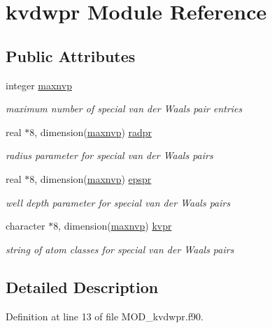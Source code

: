 \hypertarget{classkvdwpr}{\section{kvdwpr Module Reference}
\label{classkvdwpr}
}
\subsection*{Public Attributes}
\begin{DoxyCompactItemize}
\item 
integer \hyperlink{classkvdwpr_a953f1c95b2e2a786aba2e6ab070acba7}{maxnvp}
\begin{DoxyCompactList}\small\item\em maximum number of special van der Waals pair entries \end{DoxyCompactList}\item 
real $\ast$8, dimension(\hyperlink{classkvdwpr_a953f1c95b2e2a786aba2e6ab070acba7}{maxnvp}) \hyperlink{classkvdwpr_a16ab9500f997f0c7103d7d72d19c636a}{radpr}
\begin{DoxyCompactList}\small\item\em radius parameter for special van der Waals pairs \end{DoxyCompactList}\item 
real $\ast$8, dimension(\hyperlink{classkvdwpr_a953f1c95b2e2a786aba2e6ab070acba7}{maxnvp}) \hyperlink{classkvdwpr_aefc977d08f7c4a7df5221f728481efe7}{epspr}
\begin{DoxyCompactList}\small\item\em well depth parameter for special van der Waals pairs \end{DoxyCompactList}\item 
character $\ast$8, dimension(\hyperlink{classkvdwpr_a953f1c95b2e2a786aba2e6ab070acba7}{maxnvp}) \hyperlink{classkvdwpr_af3a68e901602c7a68f74d10294fe54d2}{kvpr}
\begin{DoxyCompactList}\small\item\em string of atom classes for special van der Waals pairs \end{DoxyCompactList}\end{DoxyCompactItemize}


\subsection{Detailed Description}


Definition at line 13 of file M\-O\-D\-\_\-kvdwpr.\-f90.



